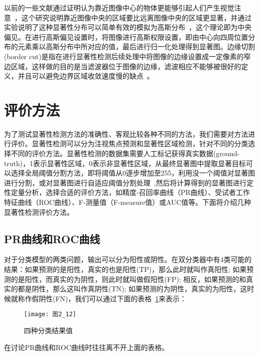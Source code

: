 以前的一些文献通过证明认为靠近图像中心的物体更能够引起人们产生视觉注意~\cite{JuddICCV2009Learning}，这个研究说明靠近图像中央的区域要比远离图像中央的区域更显著，并通过实验说明了这种显著性分布可以简单有效的模拟为高斯分布~\cite{ZhangLin2013SDSP}，这个理论即为中央偏见。在进行高斯偏见设置时，将图像进行高斯权限设置，即由中心向四周位置分布的元素乘以高斯分布中所对应的值，最后进行归一化处理得到显著图。边缘切割(border cut)是指在进行显著性检测后续处理中将图像的边缘设置成一定像素的窄边区域，这样做的目的是当滤波器位于图像的边缘，滤波相应不能够被很好的定义，并且可以避免边界区域收敛速度慢的缺点~\cite{ChengMingMingCVPR2011Global}。

\section{评价方法}
\label{2_5}

为了测试显著性检测方法的准确性、客观比较各种不同的方法，我们需要对方法进行评价。显著性检测可以分为注视焦点预测和显著性区域检测\cite{LiYinCVPR2014Secrets}，针对不同的分类选择不同的评价方法。显著性检测的数据集需要人工标记获得真实数据(ground-truth)，1表示显著性区域，0表示非显著性区域，从最终显著图中提取显著目标可以选择全局阈值分割方法，即将阈值从0逐步增加至255，利用没一个阈值对显著图进行分割，或对显著图进行自适应阈值分割处理~\cite{AchantaCVPR2009Frequency},然后将计算得到的显著图进行定性定量分析，选择合适的评价方法，如精度-召回率曲线（PR曲线）、受试者工作特征曲线（ROC曲线）、F-测量值（F-measure值）或AUC值等。下面将介绍几种显著性检测评价方法。

\subsection{PR曲线和ROC曲线}
\label{2_5_1}

对于分类模型的两类问题，输出可以分为阳性或阴性\cite{Powers2007Evaluation}。在双分类器中有4类可能的结果：如果预测的是阳性，真实的也是阳性(TP)，那么此时就叫作真阳性; 如果预测的是阳性，而真实的为阴性，则此时就叫做假阳性(FP); 相反，如果预测的和真实的都是阴性，那么这叫作真阴性(TN); 如果预测的为阴性，真实的为阳性，这时候就称作假阴性(FN)，我们可以通过下面的表格~\ref{图2_12}来表示：
\begin{figure}[h] %
  \centering
  \texttt{[image: 图2\_12]}
  \caption{四种分类结果值}
  \label{图2_12}
\end{figure}
在讨论PR曲线和ROC曲线时往往离不开上面的表格。

